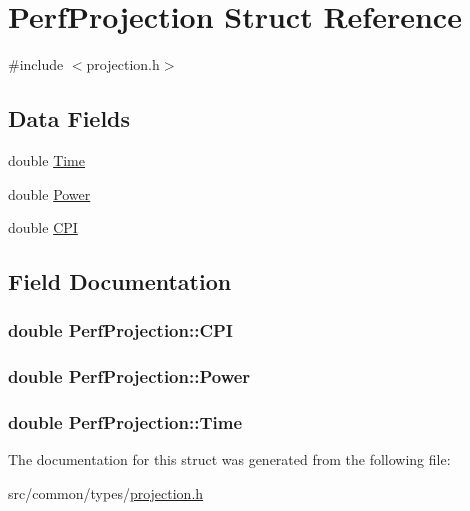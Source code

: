 \hypertarget{structPerfProjection}{}\section{Perf\+Projection Struct Reference}
\label{structPerfProjection}


{\ttfamily \#include $<$projection.\+h$>$}

\subsection*{Data Fields}
\begin{DoxyCompactItemize}
\item 
double \hyperlink{structPerfProjection_a20fa7706919197ef33ecb254ba9c3a51}{Time}
\item 
double \hyperlink{structPerfProjection_a38e44daa7f3207aa12d33237adf610c7}{Power}
\item 
double \hyperlink{structPerfProjection_a106aa0862aede23e458c156e335f95ff}{C\+PI}
\end{DoxyCompactItemize}


\subsection{Field Documentation}
\subsubsection[{\texorpdfstring{C\+PI}{CPI}}]{\setlength{\rightskip}{0pt plus 5cm}double Perf\+Projection\+::\+C\+PI}\hypertarget{structPerfProjection_a106aa0862aede23e458c156e335f95ff}{}\label{structPerfProjection_a106aa0862aede23e458c156e335f95ff}
\subsubsection[{\texorpdfstring{Power}{Power}}]{\setlength{\rightskip}{0pt plus 5cm}double Perf\+Projection\+::\+Power}\hypertarget{structPerfProjection_a38e44daa7f3207aa12d33237adf610c7}{}\label{structPerfProjection_a38e44daa7f3207aa12d33237adf610c7}
\subsubsection[{\texorpdfstring{Time}{Time}}]{\setlength{\rightskip}{0pt plus 5cm}double Perf\+Projection\+::\+Time}\hypertarget{structPerfProjection_a20fa7706919197ef33ecb254ba9c3a51}{}\label{structPerfProjection_a20fa7706919197ef33ecb254ba9c3a51}


The documentation for this struct was generated from the following file\+:\begin{DoxyCompactItemize}
\item 
src/common/types/\hyperlink{projection_8h}{projection.\+h}\end{DoxyCompactItemize}

